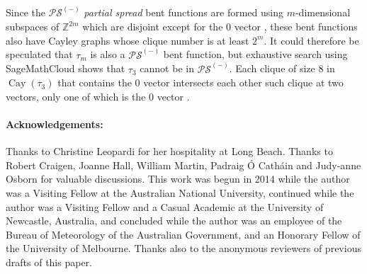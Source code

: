\documentclass[11pt,a4paper]{jacodesmath}
\newcommand{\mb}[1]{\mathbb{#1}}
\newcommand{\Cay}{\operatorname{Cay}}
\newcommand{\Z}{\mb{Z}}
\begin{document}
Since the $\mathcal{PS}^{(-)}$ \emph{partial spread}
bent functions are formed using $m$-di\-mensional subspaces of $\Z^{2m}$ which are disjoint except
for the $0$ vector \cite[p. 95]{Dil74},
these bent functions also have Cayley graphs whose clique number is at least $2^m$.
It could therefore be speculated that $\tau_m$ is also a $\mathcal{PS}^{(-)}$ bent function,
but exhaustive search using SageMathCloud \cite{SageMathCloud} shows that $\tau_3$ cannot be in
$\mathcal{PS}^{(-)}$.
Each clique of size 8 in $\Cay(\tau_3)$ that contains the 0 vector intersects each other such
clique at two vectors, only one of which is the 0 vector \cite{Leo16SMC}.

\paragraph*{Acknowledgements:}

Thanks to Christine Leopardi for her hospitality at Long Beach.
Thanks to Robert Craigen, Joanne Hall, William Martin,
Padraig {\'O} Cath{\'a}in and Judy-anne Osborn for valuable discussions.
This work was begun in 2014 while the author was a Visiting Fellow at the Australian National University,
continued while the author was a Visiting Fellow and a Casual Academic at the University of Newcastle, Australia,
and concluded while the author was an employee of the Bureau of Meteorology of the Australian
Government, and an Honorary Fellow of the University of Melbourne.
Thanks also to the anonymous reviewers of previous drafts of this paper.

\end{document}
